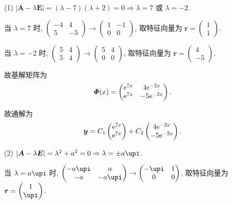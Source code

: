 \begin{solution}
  (1) $|\bm{A}-\lambda\bm{E}|=(\lambda-7)(\lambda+2)=0\Rightarrow\lambda=7$ 或 $\lambda=-2$.

  当 $\lambda=7$ 时, $\begin{pmatrix}-4&4\\5&-5\end{pmatrix}\to\begin{pmatrix}1&-1\\0&0\end{pmatrix}$, 
  取特征向量为 $\bm{r}=\begin{pmatrix}1\\1\end{pmatrix}$.

  当 $\lambda=-2$ 时, $\begin{pmatrix}5&4\\5&4\end{pmatrix}\to\begin{pmatrix}5&4\\0&0\end{pmatrix}$, 
  取特征向量为 $\bm{r}=\begin{pmatrix}4\\-5\end{pmatrix}$.

  故基解矩阵为
  \[\bm{\varPhi}(x)=\begin{pmatrix}\mathrm{e}^{7x}&4\mathrm{e}^{-2x}\\\mathrm{e}^{7x}&-5\mathrm{e}^{-2x}\end{pmatrix}.\]

  故通解为
  \[\bm{y}=C_1\begin{pmatrix}\mathrm{e}^{7x}\\\mathrm{e}^{7x}\end{pmatrix}
    + C_2\begin{pmatrix}4\mathrm{e}^{-2x}\\-5\mathrm{e}^{-2x}\end{pmatrix}.\]

  (2) $|\bm{A}-\lambda\bm{E}|=\lambda^2+a^2=0\Rightarrow\lambda=\pm a\upi$.

  当 $\lambda=a\upi$ 时, $\begin{pmatrix}-a\upi&a\\-a&-a\upi\end{pmatrix}\to\begin{pmatrix}-\upi&1\\0&0\end{pmatrix}$,
  取特征向量为 $\bm{r}=\begin{pmatrix}1\\\upi\end{pmatrix}$.


\end{solution}
